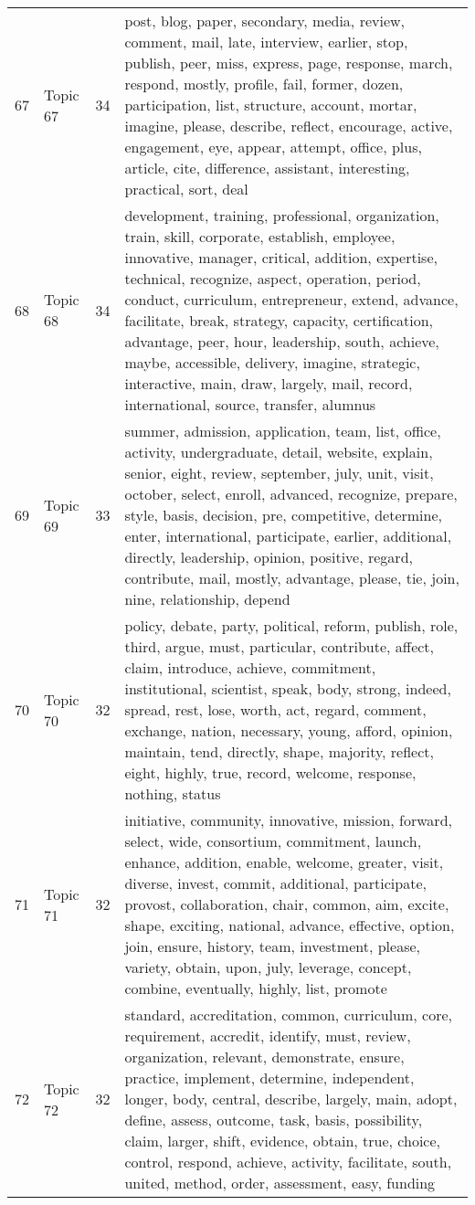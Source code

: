 \begin{table}[ht]
{\begin{tabularx}{\textwidth}{llrX}
   67 & Topic 67 & 34 & post, blog, paper, secondary, media, review, comment, mail, late, interview, earlier, stop, publish, peer, miss, express, page, response, march, respond, mostly, profile, fail, former, dozen, participation, list, structure, account, mortar, imagine, please, describe, reflect, encourage, active, engagement, eye, appear, attempt, office, plus, article, cite, difference, assistant, interesting, practical, sort, deal \\ 
   68 & Topic 68 & 34 & development, training, professional, organization, train, skill, corporate, establish, employee, innovative, manager, critical, addition, expertise, technical, recognize, aspect, operation, period, conduct, curriculum, entrepreneur, extend, advance, facilitate, break, strategy, capacity, certification, advantage, peer, hour, leadership, south, achieve, maybe, accessible, delivery, imagine, strategic, interactive, main, draw, largely, mail, record, international, source, transfer, alumnus \\ 
   69 & Topic 69 & 33 & summer, admission, application, team, list, office, activity, undergraduate, detail, website, explain, senior, eight, review, september, july, unit, visit, october, select, enroll, advanced, recognize, prepare, style, basis, decision, pre, competitive, determine, enter, international, participate, earlier, additional, directly, leadership, opinion, positive, regard, contribute, mail, mostly, advantage, please, tie, join, nine, relationship, depend \\ 
   70 & Topic 70 & 32 & policy, debate, party, political, reform, publish, role, third, argue, must, particular, contribute, affect, claim, introduce, achieve, commitment, institutional, scientist, speak, body, strong, indeed, spread, rest, lose, worth, act, regard, comment, exchange, nation, necessary, young, afford, opinion, maintain, tend, directly, shape, majority, reflect, eight, highly, true, record, welcome, response, nothing, status \\ 
   71 & Topic 71 & 32 & initiative, community, innovative, mission, forward, select, wide, consortium, commitment, launch, enhance, addition, enable, welcome, greater, visit, diverse, invest, commit, additional, participate, provost, collaboration, chair, common, aim, excite, shape, exciting, national, advance, effective, option, join, ensure, history, team, investment, please, variety, obtain, upon, july, leverage, concept, combine, eventually, highly, list, promote \\ 
   72 & Topic 72 & 32 & standard, accreditation, common, curriculum, core, requirement, accredit, identify, must, review, organization, relevant, demonstrate, ensure, practice, implement, determine, independent, longer, body, central, describe, largely, main, adopt, define, assess, outcome, task, basis, possibility, claim, larger, shift, evidence, obtain, true, choice, control, respond, achieve, activity, facilitate, south, united, method, order, assessment, easy, funding \\ 

\end{tabularx}}
\end{table}
